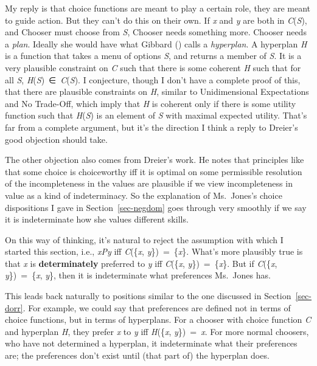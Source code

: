 \documentclass[
  10.5pt,
  twoside]{article}
\begin{document}
My reply is that choice functions are meant to play a certain role, they
are meant to guide action. But they can't do this on their own. If
\emph{x} and \emph{y} are both in \emph{C}(\emph{S}), and Chooser must
choose from \emph{S}, Chooser needs something more. Chooser needs a
\emph{plan}. Ideally she would have what Gibbard
() calls a \emph{hyperplan}. A hyperplan
\emph{H} is a function that takes a menu of options \emph{S}, and
returns a member of \emph{S}. It is a very plausible constraint on
\emph{C} such that there is some coherent \emph{H} such that for all
\emph{S}, \emph{H}(\emph{S})~∈~\emph{C}(\emph{S}). I conjecture, though
I don't have a complete proof of this, that there are plausible
constraints on \emph{H}, similar to Unidimensional Expectations and No
Trade-Off, which imply that \emph{H} is coherent only if there is some
utility function such that \emph{H}(\emph{S}) is an element of \emph{S}
with maximal expected utility. That's far from a complete argument, but
it's the direction I think a reply to Dreier's good objection should
take.

The other objection also comes from Dreier's work. He notes that
principles like that some choice is choiceworthy iff it is optimal on
some permissible resolution of the incompleteness in the values are
plausible if we view incompleteness in value as a kind of indeterminacy.
So the explanation of Ms.~Jones's choice dispositions I gave in
Section~\ref{sec-negdom} goes through very smoothly if we say it is
indeterminate how she values different skills.

On this way of thinking, it's natural to reject the assumption with
which I started this section, i.e., \emph{xPy} iff \emph{C}(\{\emph{x},
\emph{y}\})~=~\{\emph{x}\}. What's more plausibly true is that \emph{x}
is \textbf{determinately} preferred to \emph{y} iff \emph{C}(\{\emph{x},
\emph{y}\})~=~\{\emph{x}\}. But if \emph{C}(\{\emph{x},
\emph{y}\})~=~\{\emph{x}, \emph{y}\}, then it is indeterminate what
preferences Ms.~Jones has.

This leads back naturally to positions similar to the one discussed in
Section~\ref{sec-dorr}. For example, we could say that preferences are
defined not in terms of choice functions, but in terms of hyperplans.
For a chooser with choice function \emph{C} and hyperplan \emph{H}, they
prefer \emph{x} to \emph{y} iff \emph{H}(\{\emph{x},
\emph{y}\})~=~\emph{x}. For more normal choosers, who have not
determined a hyperplan, it indeterminate what their preferences are; the
preferences don't exist until (that part of) the hyperplan does.
\end{document}

